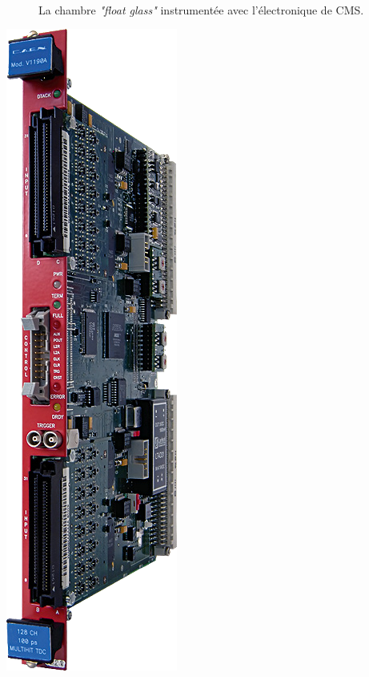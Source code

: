 \begin{figure}[ht]
	 \hfill
	{\,}
	\caption{La chambre \textit{"float glass"} instrumentée avec l'électronique de CMS.}
	\label{chambrefloat}
\end{figure}
\marginpar
{
	\centering
	\includegraphics[width=0.5\marginparwidth]{GLA/TDC.png}
	\captionsetup{type=figure}\caption{TDC CAEN V1190A.}
	\label{TDC}
}

